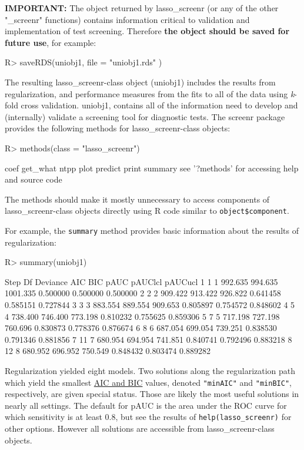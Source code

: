 \documentclass[11pt]{report}
\renewenvironment{Schunk}{\vspace{\topsep}}{\vspace{\topsep}}
\begin{document}
\textbf{IMPORTANT:} The object returned by \textsf{lasso\_screenr} (or any of the other
\textsf{"\_screenr"} functions) contains information critical to validation and
implementation of test screening. Therefore \textbf{the object should be saved
for future use}, for example:
\begin{Schunk}
\begin{Sinput}
R> saveRDS(uniobj1, file = "uniobj1.rds" )
\end{Sinput}
\end{Schunk}

The resulting \textsf{lasso\_screenr}-class object (\textsf{uniobj1})
includes the results from regularization, and performance measures from
the fits to all of the data using \emph{k}-fold cross validation.
\textsf{uniobj1}, contains all of the information need to develop and
(internally) validate a screening tool for diagnostic tests. The
\textsf{screenr} package provides the following methods for
\textsf{lasso\_screenr}-class objects:
\begin{Schunk}
\begin{Sinput}
R> methods(class = "lasso_screenr")
\end{Sinput}
\begin{Soutput}
[1] coef     get_what ntpp     plot     predict  print    summary
see '?methods' for accessing help and source code
\end{Soutput}
\end{Schunk}
The methods should make it mostly unnecessary to access components of
\textsf{lasso\_screenr}-class objects directly using \textsf{R} code similar to
\verb|object$component|.

For example, the \verb|summary| method provides basic information about the results
of regularization:
\begin{Schunk}
\begin{Sinput}
R> summary(uniobj1)
\end{Sinput}
\begin{Soutput}
  Step Df Deviance     AIC      BIC     pAUC  pAUClcl  pAUCucl
1    1  1  992.635 994.635 1001.335 0.500000 0.500000 0.500000
2    2  2  909.422 913.422  926.822 0.641458 0.585151 0.727844
3    3  3  883.554 889.554  909.653 0.805897 0.754572 0.848602
4    5  4  738.400 746.400  773.198 0.810232 0.755625 0.859306
5    7  5  717.198 727.198  760.696 0.830873 0.778376 0.876674
6    8  6  687.054 699.054  739.251 0.838530 0.791346 0.881856
7   11  7  680.954 694.954  741.851 0.840741 0.792496 0.883218
8   12  8  680.952 696.952  750.549 0.848432 0.803474 0.889282
\end{Soutput}
\end{Schunk}
Regularization yielded eight models. Two solutions along the
regularization path which yield the smallest
\href{https://docs.displayr.com/wiki/Information_Criteria}{AIC and
BIC} values, denoted \verb|"minAIC"| and \verb|"minBIC"|,
respectively, are given special status.  Those are likely the most
useful solutions in nearly all settings.  The default for pAUC is the
area under the ROC curve for which sensitivity is at least 0.8, but
see the results of \verb|help(lasso_screenr)| for other
options. However all solutions are accessible from
\textsf{lasso\_screenr}-class objects.
\end{document}
